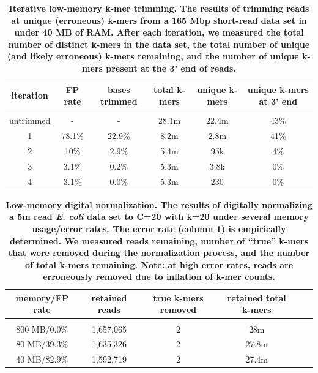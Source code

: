 \documentclass[10pt]{article}
\begin{document}
\begin{table}[!ht]
\caption{
\bf{Iterative low-memory k-mer trimming.  The results of trimming
  reads at unique (erroneous) k-mers from a 165 Mbp short-read data
  set in under 40 MB of RAM.  After each iteration, we measured the
  total number of distinct k-mers in the data set, the total number
  of unique (and likely erroneous) k-mers remaining, and the
  number of unique k-mers present at the 3' end of reads.}}
\begin{tabular}{ | c | c | c | c | c | c |}
iteration & FP rate & bases trimmed & total k-mers & unique k-mers & 
unique k-mers at 3' end \\
\hline \\
untrimmed  &      -  &      - & 28.1m & 22.4m & 43\% \\
1          & 78.1\%  & 22.9\% &  8.2m &  2.8m & 41\% \\
2          &   10\%  &  2.9\% &  5.4m &   95k &  4\% \\
3          &  3.1\%  &  0.2\% &  5.3m &  3.8k &  0\% \\
4          &  3.1\%  &  0.0\% &  5.3m &   230 &  0\% \\
\end{tabular}
\begin{flushleft}
\end{flushleft}
\label{table:loop_trim}
\end{table}



\begin{table}[!ht]
\caption{
\bf{Low-memory digital normalization. The results of digitally
  normalizing a 5m read {\em E. coli} data set to C=20 with k=20 under
  several memory usage/error rates.  The error rate
  (column 1) is empirically determined.  We measured reads remaining,
  number of ``true'' k-mers that were removed during the normalization
  process, and the number of total k-mers remaining.  Note: at high
  error rates, reads are erroneously removed due to inflation
  of k-mer counts.}}
\begin{tabular}{ | c | c | c | c | c | c |}
memory/FP rate & retained reads & true k-mers removed & retained total k-mers \\
\hline \\
 800 MB/0.0\% & 1,657,065 & 2 &   28m \\
 80 MB/39.3\% & 1,635,326 & 2 & 27.8m \\
 40 MB/82.9\% & 1,592,719 & 2 & 27.4m \\
\end{tabular}
\begin{flushleft}
\end{flushleft}
\label{table:loop_norm}
\end{table}
\end{document}
